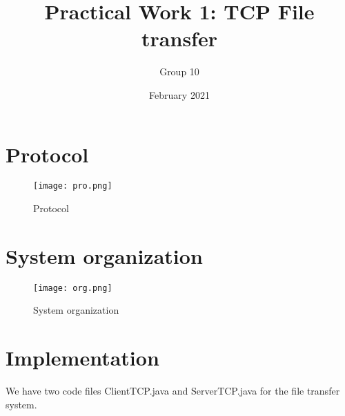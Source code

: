 \documentclass{article}
\title{Practical Work 1: TCP File transfer}
\author{Group 10}
\date{February 2021}
\begin{document}
\maketitle

\section{Protocol}
\begin{figure}[ht]
\centering
\texttt{[image: pro.png]}
\caption{Protocol}
\end{figure}

\section{System organization}
\begin{figure}[ht]
\centering
\texttt{[image: org.png]}
\caption{System organization}
\end{figure}

\section{Implementation}
We have two code files ClientTCP.java and ServerTCP.java for the file transfer system.
\end{document}
